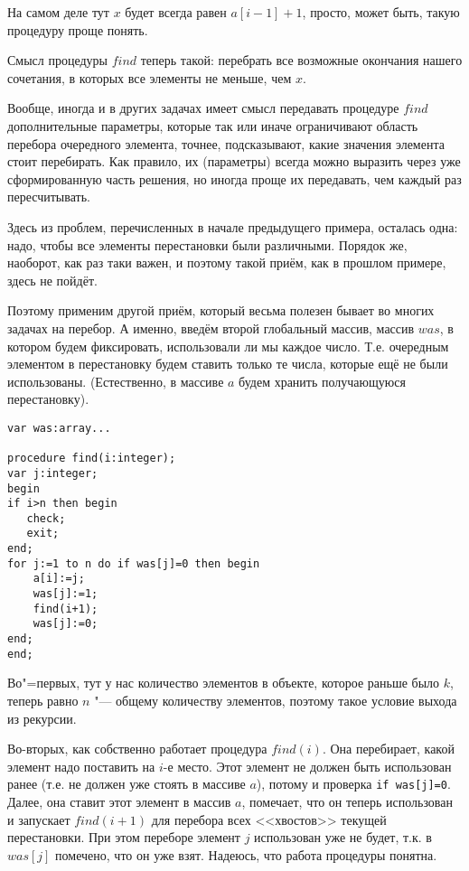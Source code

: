 На самом деле тут $x$ будет всегда равен $a[i-1]+1$, просто, может быть, такую 
процедуру проще понять.

Смысл процедуры $find$ теперь такой: перебрать все возможные окончания нашего 
сочетания, в которых все элементы не меньше, чем $x$.

Вообще, иногда и в других задачах имеет смысл передавать процедуре $find$ 
дополнительные параметры, которые так или иначе ограничивают область перебора 
очередного элемента, точнее, подсказывают, какие значения элемента стоит 
перебирать. Как правило, их (параметры) всегда можно выразить через уже 
сформированную часть решения, но иногда проще их передавать, чем каждый раз пересчитывать.


Здесь из проблем, перечисленных в начале предыдущего примера, осталась одна: 
надо, чтобы все элементы перестановки были различными. Порядок же, наоборот, 
как раз таки важен, и поэтому такой приём, как в прошлом примере, здесь не 
пойдёт. 

Поэтому применим другой приём, который весьма полезен бывает во многих задачах 
на перебор. А именно, введём второй глобальный массив, массив $was$, в котором 
будем фиксировать, использовали ли мы каждое число. Т.е. очередным элементом в 
перестановку будем ставить только те числа, которые ещё не были использованы.
(Естественно, в массиве $a$ будем хранить получающуюся перестановку).

\begin{codesampleo}\begin{verbatim}
var was:array...

procedure find(i:integer);
var j:integer;
begin
if i>n then begin
   check;
   exit;
end;
for j:=1 to n do if was[j]=0 then begin
    a[i]:=j;
    was[j]:=1;
    find(i+1);
    was[j]:=0;
end;
end;
\end{verbatim}
\end{codesampleo}

Во"=первых, тут у нас количество элементов в объекте, которое раньше было $k$, 
теперь равно $n$ "--- общему количеству элементов, поэтому такое условие выхода из 
рекурсии.

Во-вторых, как собственно работает процедура $find(i)$. Она перебирает, какой 
элемент надо поставить на $i$-е место. Этот элемент не должен быть использован 
ранее (т.е. не должен уже стоять в массиве $a$), потому и проверка \texttt{if was[j]=0}.
Далее, она ставит этот элемент в массив $a$, помечает, что он теперь 
использован и запускает $find(i+1)$ для перебора всех <<хвостов>> текущей 
перестановки. При этом переборе элемент $j$ использован уже не будет, т.к. в 
$was[j]$ помечено, что он уже взят. Надеюсь, что работа процедуры понятна.

